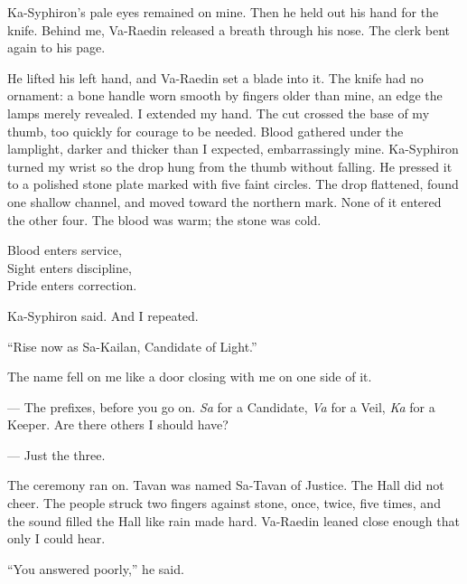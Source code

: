 Ka-Syphiron's pale eyes remained on mine. Then he held out his hand for the knife. Behind me, Va-Raedin released a breath through his nose. The clerk bent again to his page.\par

He lifted his left hand, and Va-Raedin set a blade into it. The knife had no ornament: a bone handle worn smooth by fingers older than mine, an edge the lamps merely revealed. I extended my hand. The cut crossed the base of my thumb, too quickly for courage to be needed. Blood gathered under the lamplight, darker and thicker than I expected, embarrassingly mine. Ka-Syphiron turned my wrist so the drop hung from the thumb without falling. He pressed it to a polished stone plate marked with five faint circles. The drop flattened, found one shallow channel, and moved toward the northern mark. None of it entered the other four. The blood was warm; the stone was cold.\par

\begin{scripture}
Blood enters service,\\
Sight enters discipline,\\
Pride enters correction.\\
\end{scripture}

Ka-Syphiron said. And I repeated.\par

``Rise now as Sa-Kailan, Candidate of Light.''\par

The name fell on me like a door closing with me on one side of it.

\begin{room}

--- The prefixes, before you go on. \textit{Sa } for a Candidate, \textit{Va } for a Veil, \textit{Ka } for a Keeper. Are there others I should have?

--- Just the three.

\end{room}

The ceremony ran on. Tavan was named Sa-Tavan of Justice. The Hall did not cheer. The people struck two fingers against stone, once, twice, five times, and the sound filled the Hall like rain made hard. Va-Raedin leaned close enough that only I could hear.\par

``You answered poorly,'' he said.\par

